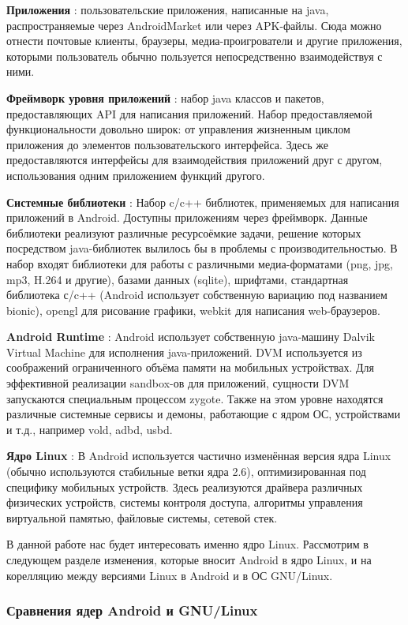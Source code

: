 \textbf{Приложения} : пользовательские приложения, написанные на java,
распространяемые через AndroidMarket или через APK-файлы. Сюда можно
отнести почтовые клиенты, браузеры, медиа-проигрователи и другие
приложения, которыми пользователь обычно пользуется непосредственно
взаимодействуя с ними. 

\textbf{Фреймворк уровня приложений} : набор java классов и пакетов,
предоставляющих API для написания приложений. Набор предоставляемой
функциональности довольно широк: от управления жизненным циклом
приложения до элементов пользовательского интерфейса. Здесь же
предоставляются интерфейсы для взаимодействия приложений друг с другом,
использования одним приложением функций другого.

\textbf{Системные библиотеки} : Набор c/c++ библиотек, применяемых для
написания приложений в Android. Доступны приложениям через фреймворк.
Данные библиотеки реализуют различные ресурсоёмкие задачи, решение
которых посредством java-библиотек вылилось бы в проблемы с
производительностью. В набор входят библиотеки для работы с различными
медиа-форматами (png, jpg, mp3, H.264 и другие), базами данных (sqlite), 
шрифтами, стандартная библиотека с/c++ (Android использует собственную
вариацию под названием bionic), opengl для рисование графики, webkit для
написания web-браузеров. 

\textbf{Android Runtime} : Android использует собственную java-машину
Dalvik Virtual Machine для исполнения java-приложений. DVM используется
из соображений ограниченного объёма памяти на мобильных устройствах. Для
эффективной реализации sandbox-ов для приложений, сущности DVM
запускаются специальным процессом zygote. Также на этом уровне находятся
различные системные сервисы и демоны, работающие с ядром ОС,
устройствами и т.д., например vold, adbd, usbd.

\textbf{Ядро Linux} : В Android используется частично изменённая версия
ядра Linux (обычно используются стабильные ветки ядра 2.6),
оптимизированная под специфику мобильных устройств. Здесь реализуются
драйвера различных физических устройств, системы контроля доступа,
алгоритмы управления виртуальной памятью, файловые системы, сетевой
стек.

В данной работе нас будет интересовать именно ядро Linux. Рассмотрим в
следующем разделе изменения, которые вносит Android в ядро Linux, и на
корелляцию между версиями Linux в Android и в ОС GNU/Linux.

\subsubsection{Сравнения ядер Android и GNU/Linux}

